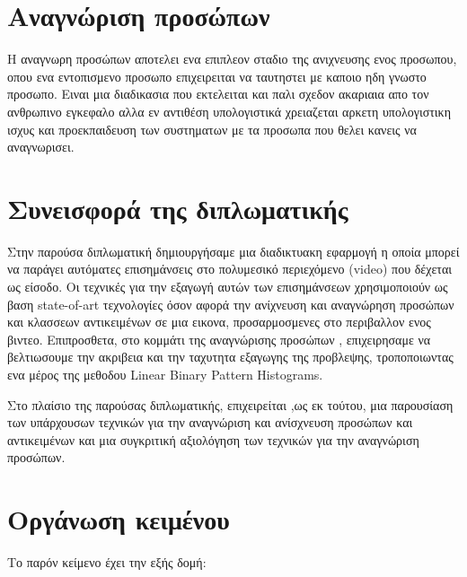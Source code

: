\section{Αναγνώριση προσώπων}
Η αναγνωρη προσώπων αποτελει ενα επιπλεον σταδιο της ανιχνευσης ενος προσωπου,
οπου ενα εντοπισμενο προσωπο επιχειρειται να ταυτηστει με καποιο ηδη γνωστο προσωπο.
Ειναι μια διαδικασια που εκτελειται και παλι σχεδον ακαριαια απο τον ανθρωπινο εγκεφαλο
αλλα εν αντιθέση υπολογιστικά χρειαζεται αρκετη υπολογιστικη ισχυς και προεκπαιδευση
των συστηματων με τα προσωπα που θελει κανεις να αναγνωρισει.

\section{Συνεισφορά της διπλωματικής}

Στην παρούσα διπλωματική δημιουργήσαμε μια διαδικτυακη εφαρμογή η οποία μπορεί να παράγει
αυτόματες επισημάνσεις στο πολυμεσικό περιεχόμενο (video) που δέχεται ως
είσοδο. Οι τεχνικές για την εξαγωγή αυτών των επισημάνσεων χρησιμοποιούν
ως βαση state-of-art τεχνολογίες όσον αφορά την ανίχνευση και αναγνώρηση προσώπων
και κλασσεων αντικειμένων σε μια εικονα, προσαρμοσμενες στο περιβαλλον ενος βιντεο.
Επιπροσθετα, στο κομμάτι της αναγνώρισης προσώπων , επιχειρησαμε να βελτιωσουμε την ακριβεια
και την ταχυτητα εξαγωγης της προβλεψης, τροποποιωντας ενα μέρος της μεθοδου
Linear Binary Pattern Histograms.

Στο πλαίσιο της παρούσας διπλωματικής, επιχειρείται ,ως εκ τούτου, μια παρουσίαση
των υπάρχουσων τεχνικών για την αναγνώριση και ανίσχνευση προσώπων και αντικειμένων
και μια συγκριτική αξιολόγηση των τεχνικών για την αναγνώριση προσώπων.

\section{Οργάνωση κειμένου}

Το παρόν κείμενο έχει την εξής δομή:

